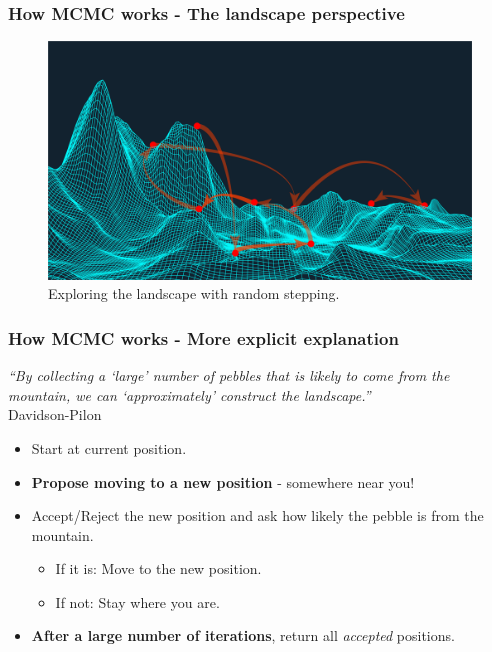 \documentclass[10pt]{beamer}
\begin{document}
\begin{frame}
	\frametitle{How MCMC works - The landscape perspective}
	\begin{figure}[h]
		\centering
		\includegraphics[width=\textwidth]{mountain}
		\caption{Exploring the landscape with random stepping.}
	\end{figure}
\end{frame} 

\begin{frame}
	\frametitle{How MCMC works - More explicit explanation}
	\begin{center}
		\textit{``By collecting a `large' number of pebbles that is likely to come from the mountain, we can `approximately' construct the landscape.''} \\
		\tiny{Davidson-Pilon}
	\end{center}
	\begin{itemize}
		\item Start at current position.
		\item \textbf{Propose moving to a new position} - somewhere near you!
		\item Accept/Reject the new position and ask how likely the pebble is from the mountain.
		\begin{itemize}
			\item If it is: Move to the new position.
			\item If not: Stay where you are.
		\end{itemize}
		\item \textbf{After a large number of iterations}, return all \textit{accepted} positions.
	\end{itemize}
\end{frame}
\end{document}
